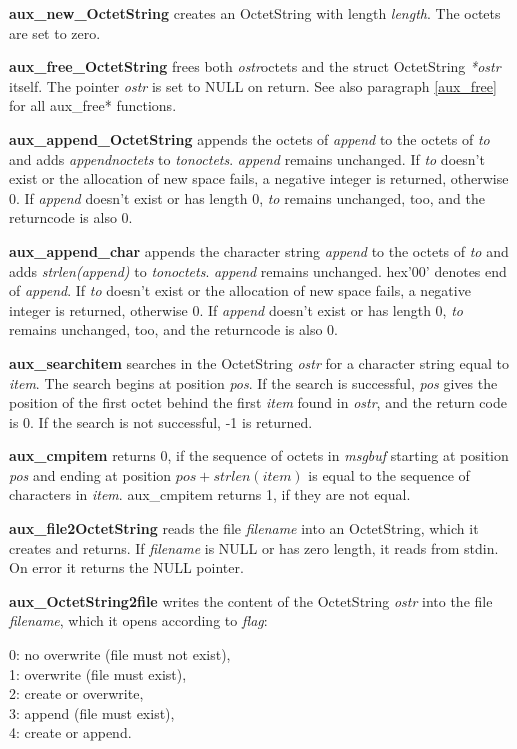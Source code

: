 {\bf aux\_new\_OctetString} creates an OctetString with length {\em length}. The octets
are set to zero.

{\bf aux\_free\_OctetString} frees both 
{\em *ostr}\pf octets and the struct OctetString {\em **ostr} itself.
The pointer {\em *ostr} is set to NULL on return.
See also paragraph \ref{aux_free} for all aux\_free* functions.

{\bf aux\_append\_OctetString} appends the octets of {\em append} to the octets
of {\em to}
and adds {\em append\pf noctets} to {\em to\pf noctets}.
{\em append} remains unchanged.
If {\em to} doesn't exist or the allocation of new space fails,
a negative integer is returned, otherwise 0.
If {\em append} doesn't exist or has length 0, {\em to}
remains unchanged, too, and the returncode is also 0.

{\bf aux\_append\_char} appends the character string {\em append} to the octets
of {\em to} and adds {\em strlen(append)} to {\em to\pf noctets}.
{\em append} remains unchanged.
hex'00' denotes end of {\em append}.
If {\em to} doesn't exist or the allocation of new space fails,
a negative integer is returned, otherwise 0.
If {\em append} doesn't exist or has length 0, {\em to}
remains unchanged, too, and the returncode is also 0.

{\bf aux\_searchitem}
searches in the OctetString {\em ostr} for a character string equal to
{\em item}. The search begins at position {\em *pos}.
If the search is successful, {\em *pos} gives the position
of the first octet behind the first
{\em item} found in {\em ostr}, and the return code is 0.
If the search is not successful, -1 is returned.

{\bf aux\_cmpitem} returns 0, if the sequence of octets in {\em msgbuf}
starting at position {\em pos} and ending at position
$pos+strlen(item)$
is equal to the sequence of characters in {\em item}.
aux\_cmpitem returns 1, if they are not equal.

{\bf aux\_file2OctetString} reads the file {\em filename} into
an OctetString, which it creates and returns. If {\em filename}
is NULL or has zero length, it reads from stdin.
On error it returns the NULL pointer.

{\bf aux\_OctetString2file} writes the content of the OctetString
{\em ostr} into the file {\em filename},
which it opens according to {\em flag}:
 
0: no overwrite (file must not exist), \\
1: overwrite (file must exist), \\
2: create or overwrite, \\
3: append (file must exist), \\
4: create or append.
 
